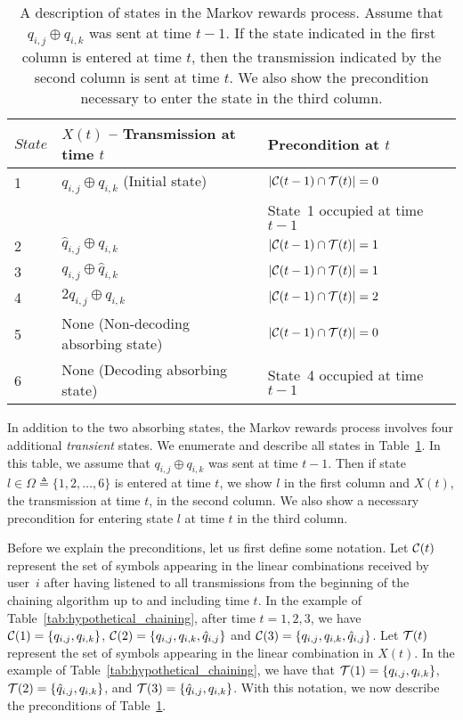 \begin{table}
	\begin{center}
		\begin{tabular}{l | l | p{4.5cm} c }
			$State$              & $X(t)$ -- Transmission at time $t$ & Precondition at $t$  \\
			\hline
			1 & $q_{i, j} \oplus q_{i, k}$ (Initial state) & $|\mathcal{C}(t-1) \cap \mathcal{T}(t)| = 0$\\
			&& State~1 occupied at time $t-1$\\ 
			2 & $\hat{q}_{i, j} \oplus q_{i, k}$ & $|\mathcal{C}(t-1) \cap \mathcal{T}(t)| = 1$ \\ 
			3 & $q_{i, j} \oplus \hat{q}_{i, k}$ & $|\mathcal{C}(t-1) \cap \mathcal{T}(t)| = 1$ \\ 
			4 & $2q_{i, j} \oplus q_{i, k} $  & $|\mathcal{C}(t-1) \cap \mathcal{T}(t)| = 2$ \\ 	
			5 & None (Non-decoding absorbing state)  & $|\mathcal{C}(t-1) \cap \mathcal{T}(t)| = 0$\\ 
			6 & None (Decoding absorbing state)  & State~4 occupied at time $t-1$\\ 
		\end{tabular}
	\end{center}
	\caption{A description of states in the Markov rewards process.  Assume that $q_{i, j} \oplus q_{i, k}$ was sent at time $t-1$.  If the state indicated in the first column is entered at time $t$, then the transmission indicated by the second column is sent at time $t$.  We also show the precondition necessary to enter the state in the third column.}	
	\label{tab:table_of_states}
\end{table}

In addition to the two absorbing states, the Markov rewards process involves four additional \emph{transient} states.  We enumerate and describe all states in Table~\ref{tab:table_of_states}.  In this table, we assume that $q_{i, j} \oplus q_{i, k}$ was sent at time $t-1$.  Then if state $l \in \Omega \triangleq \{1, 2, \ldots, 6\}$ is entered at time $t$, we show $l$ in the first column and $X(t)$, the transmission at time $t$, in the second column.  We also show a necessary precondition for entering state $l$ at time $t$ in the third column.

Before we explain the preconditions, let us first define some notation.  Let $\mathcal{C}(t)$ represent the set of symbols appearing in the linear combinations received by user~$i$ after having listened to all transmissions from the beginning of the chaining algorithm up to and including time $t$.  In the example of Table~\ref{tab:hypothetical_chaining}, after time $t = 1, 2, 3$, we have $\mathcal{C}(1) = \{q_{i, j}, q_{i, k}\}$, $\mathcal{C}(2) = \{q_{i, j}, q_{i, k}, \hat{q}_{i, j}\}$ and $\mathcal{C}(3) = \{q_{i, j}, q_{i, k}, \hat{q}_{i, j}\}$.  Let $\mathcal{T}(t)$ represent the set of symbols appearing in the linear combination in $X(t)$.  In the example of Table~\ref{tab:hypothetical_chaining}, we have that $\mathcal{T}(1) = \{q_{i, j}, q_{i, k}\}$, $\mathcal{T}(2) = \{\hat{q}_{i, j}, q_{i, k}\}$, and $\mathcal{T}(3) = \{\hat{q}_{i, j}, q_{i, k}\}$. 
With this notation, we now describe the preconditions of Table~\ref{tab:table_of_states}.

